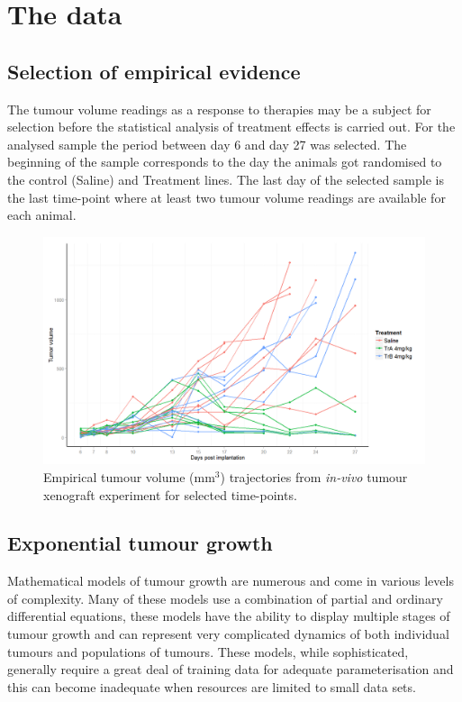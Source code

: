 \section{The data}
\subsection{Selection of empirical evidence}
The tumour volume readings as a response to therapies may be a subject for selection before the statistical analysis of treatment effects is carried out.
For the analysed sample the period between day 6 and day 27 was selected.
The beginning of the sample corresponds to the day the animals got randomised to the control (Saline) and Treatment lines.
The last day of the selected sample is the last time-point where at least two tumour volume readings are available for each animal.

\begin{figure}
	\centering
	\includegraphics[width=\textwidth]{xenograph/figures/raw_trajectories_reduced.png}
	\caption{Empirical tumour volume (mm$^3$) trajectories from \emph{in-vivo} tumour xenograft experiment for selected time-points.}
	\label{raw_trajectories_reduced}
\end{figure}

\subsection{Exponential tumour growth}

Mathematical models of tumour growth are numerous and come in various levels of complexity.
Many of these models use a combination of partial and ordinary differential equations, these models have the ability to display multiple stages of tumour growth and can represent very complicated dynamics of both individual tumours and populations of tumours.
These models, while sophisticated, generally require a great deal of training data for adequate parameterisation and this can become inadequate when resources are limited to small data sets.

